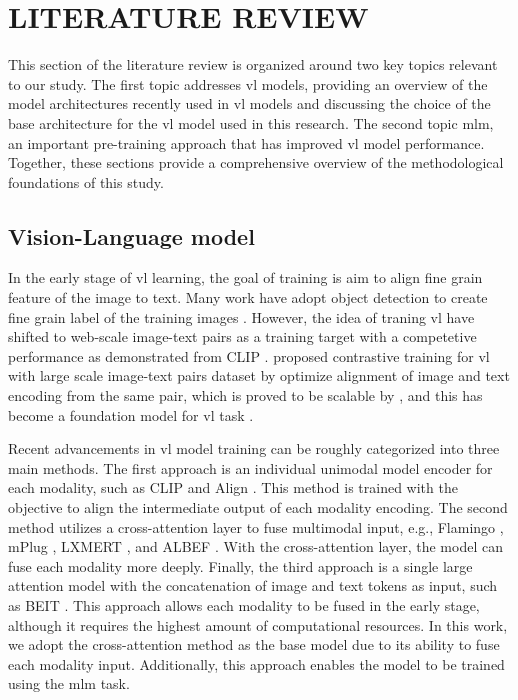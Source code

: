 \chapter{LITERATURE REVIEW}
This section of the literature review is organized around two key topics relevant to our study.
The first topic addresses \acrshort{vl} models, providing an overview of the model architectures recently used in \acrshort{vl} models and discussing the choice of the base architecture for the \acrshort{vl} model used in this research.
The second topic \acrshort{mlm}, an important pre-training approach that has improved \acrshort{vl} model performance.
Together, these sections provide a comprehensive overview of the methodological foundations of this study.

\section{Vision-Language model}
In the early stage of \acrshort{vl} learning, the goal of training is aim to align fine grain feature of the image to text.
Many work have adopt object detection to create fine grain label of the training images \cite{uniter, vlmo}.
However, the idea of traning \acrshort{vl} have shifted to web-scale image-text pairs as a training target with a competetive performance as demonstrated from CLIP \cite{clip}.
 proposed contrastive training for \acrshort{vl} with large scale image-text pairs dataset by optimize alignment of image and text encoding from the same pair, which is proved to be scalable by , and this has become a foundation model for \acrshort{vl} task \cite{foundation_model}. 

Recent advancements in \acrshort{vl} model training can be roughly categorized into three main methods.
The first approach is an individual unimodal model encoder for each modality, such as CLIP \cite{clip} and Align \cite{align}.
This method is trained with the objective to align the intermediate output of each modality encoding. 
The second method utilizes a cross-attention layer to fuse multimodal input, e.g., Flamingo \cite{flamingo}, mPlug \cite{mplug}, LXMERT \cite{lxmert}, and ALBEF \cite{albef}. 
With the cross-attention layer, the model can fuse each modality more deeply. 
Finally, the third approach is a single large attention model with the concatenation of image and text tokens as input, such as BEIT \cite{beit-3}. 
This approach allows each modality to be fused in the early stage, although it requires the highest amount of computational resources.
In this work, we adopt the cross-attention method as the base model due to its ability to fuse each modality input.
Additionally, this approach enables the model to be trained using the \acrshort{mlm} task.



